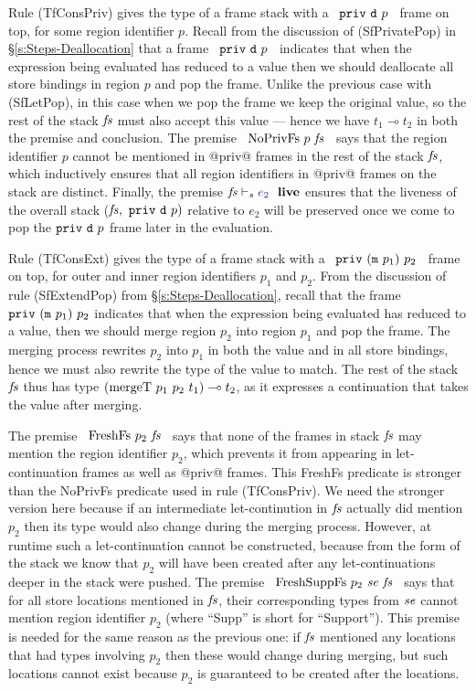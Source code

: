 Rule (TfConsPriv) gives the type of a frame stack with a ~$\texttt{priv}~ \texttt{d}~ p$~ frame on top, for some region identifier $p$. Recall from the discussion of (SfPrivatePop) in \S\ref{s:Steps-Deallocation} that a frame ~$\texttt{priv}~ \texttt{d}~ p$~ indicates that when the expression being evaluated has reduced to a value then we should deallocate all store bindings in region $p$ and pop the frame. Unlike the previous case with (SfLetPop), in this case when we pop the frame we keep the original value, so the rest of the stack $\mathit{fs}$ must also accept this value --- hence we have $t_1 \multimap t_2$ in both the premise and conclusion. The premise ~$\textrm{NoPrivFs}~ p~ \mathit{fs}$~ says that the region identifier $p$ cannot be mentioned in @priv@ frames in the rest of the stack $\mathit{fs}$, which inductively ensures that all region identifiers in @priv@ frames on the stack are distinct. Finally, the premise $\LiveS{\mfs}{e_2}$ ensures that the liveness of the overall stack ($\mathit{fs},~ \texttt{priv}~ \texttt{d}~ p)$ relative to $e_2$ will be preserved once we come to pop the $\texttt{priv}~ \texttt{d}~ p$ frame later in the evaluation.





Rule (TfConsExt) gives the type of a frame stack with a ~$\texttt{priv}~ (\texttt{m}~ p_1)~ p_2$~ frame on top, for outer and inner region identifiers $p_1$ and $p_2$. From the discussion of rule (SfExtendPop) from \S\ref{s:Steps-Deallocation}, recall that the frame $\texttt{priv}~ (\texttt{m}~ p_1)~ p_2$ indicates that when the expression being evaluated has reduced to a value, then we should merge region $p_2$ into region $p_1$ and pop the frame. The merging process rewrites $p_2$ into $p_1$ in both the value and in all store bindings, hence we must also rewrite the type of the value to match. The rest of the stack $\mathit{fs}$ thus has type $(\textrm{mergeT}~ p_1~ p_2~ t_1) \multimap t_2$, as it expresses a continuation that takes the value after merging.

The premise ~$\textrm{FreshFs}~ p_2~ \mathit{fs}$~ says that none of the frames in stack $\mathit{fs}$ may mention the region identifier $p_2$, which prevents it from appearing in let-continuation frames as well as @priv@ frames. This FreshFs predicate is stronger than the NoPrivFs predicate used in rule (TfConsPriv). We need the stronger version here because if an intermediate let-continution in $\mathit{fs}$ actually did mention $p_2$ then its type would also change during the merging process. However, at runtime such a let-continuation cannot be constructed, because from the form of the stack we know that $p_2$ will have been created after any let-continuations deeper in the stack were pushed. The premise ~$\textrm{FreshSuppFs}~ p_2~ \mathit{se}~ \mathit{fs}$~ says that for all store locations mentioned in $\mathit{fs}$, their corresponding types from $\mathit{se}$ cannot mention region identifier $p_2$ (where ``Supp'' is short for ``Support''). This premise is needed for the same reason as the previous one: if $\mathit{fs}$ mentioned any locations that had types involving $p_2$ then these would change during merging, but such locations cannot exist because $p_2$ is guaranteed to be created after the locations. 

